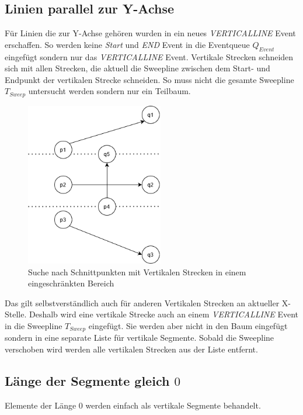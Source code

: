 \documentclass[conference]{IEEEtran}
\begin{document}
	\subsection{Linien parallel zur Y-Achse}
	Für Linien die zur Y-Achse gehören wurden in ein neues \textit{VERTICALLINE} Event erschaffen. So werden keine \textit{Start} und \textit{END} Event in die Eventqueue $Q_{Event}$ eingefügt sondern nur das \textit{VERTICALLINE} Event.
	Vertikale Strecken schneiden sich mit allen Strecken, die aktuell die Sweepline zwischen dem Start- und Endpunkt der vertikalen Strecke schneiden. So muss nicht die gesamte Sweepline $T_{Sweep}$ untersucht werden sondern nur ein Teilbaum.
	\begin{figure}[h]
		\begin{center}
			\includegraphics[width=6cm]{Vertikal.png}
			\caption{Suche nach Schnittpunkten mit Vertikalen Strecken in einem eingeschränkten Bereich}
			\label{figure_3}
		\end{center}
	\end{figure}
	Das gilt selbstverständlich auch für anderen Vertikalen Strecken an aktueller X-Stelle. Deshalb wird eine vertikale Strecke auch an einem \textit{VERTICALLINE} Event in die Sweepline $T_{Sweep}$ eingefügt. Sie werden aber nicht in den Baum eingefügt sondern in eine separate Liste für vertikale Segmente. Sobald die Sweepline verschoben wird werden alle vertikalen Strecken aus der Liste entfernt.
		
	\subsection{Länge der Segmente gleich $0$}
	Elemente der Länge 0 werden einfach als vertikale Segmente behandelt.
	
\end{document}
